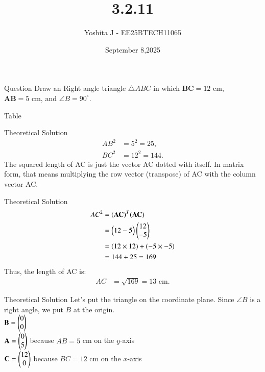 \documentclass{beamer}
\begin{document}
\title 
{3.2.11}
\date{September 8,2025}


\author 
{Yoshita J - EE25BTECH11065}






\frame{\titlepage}
\begin{frame}{Question}
 Draw an Right angle  triangle $\triangle ABC$ in which $\boldsymbol{BC} = 12 \text{ cm}$, $\boldsymbol{AB} = 5 \text{ cm}$, and $\angle B = 90^\circ$.

\end{frame}



\begin{frame}{Table}
    \begin{table}[h!]    
      \centering
      
      \caption{}
    \end{table}
\end{frame}
\begin{frame}{Theoretical Solution}
\begin{align*}
      AB^2 & = 5^2 = 25, \\
      BC^2 & = 12^2 = 144.
   \end{align*}
  The squared length of AC is just the vector AC dotted with itself. In matrix form, that means multiplying the row vector (transpose) of AC with the column vector AC.
\end{frame}

\begin{frame}{Theoretical Solution}
\begin{align*}
    AC^2 &= (\mathbf{AC})^T (\mathbf{AC}) \\
         &= \begin{pmatrix}12 -5\end{pmatrix} \begin{pmatrix}12 \\ -5\end{pmatrix} \\
         &= (12 \times 12) + (-5 \times -5) \\
         &= 144 + 25 = 169
\end{align*}
Thus, the length of AC is:
\begin{align*}
    AC &= \sqrt{169} = 13 \text{ cm}.
\end{align*}

\end{frame}
\begin{frame}{Theoretical Solution}
Let's put the triangle on the coordinate plane.  
Since $\angle B$ is a right angle, we put $B$ at the origin.  \\


      $\mathbf{B} = \begin{pmatrix}0\\0\end{pmatrix}$\\
      $\mathbf{A} = \begin{pmatrix}0\\5\end{pmatrix}$ because $AB = 5$ cm on the $y$-axis\\
      $\mathbf{C} = \begin{pmatrix}12\\0\end{pmatrix}$ because $BC = 12$ cm on the $x$-axis\\
\end{frame}
\end{document}
